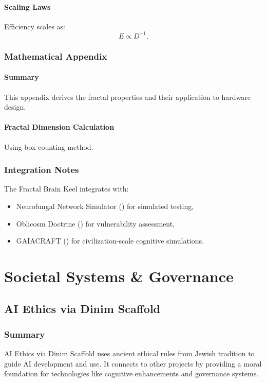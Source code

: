 \documentclass[11pt,oneside]{memoir}
\theoremstyle{plain}
\begin{document}
\subsection{Scaling Laws}
Efficiency scales as:
\begin{equation}
    E \propto D^{-1}.
\end{equation}

\section{Mathematical Appendix}
\subsection{Summary}
This appendix derives the fractal properties and their application to hardware design.

\subsection{Fractal Dimension Calculation}
Using box-counting method.

\section{Integration Notes}
The Fractal Brain Keel integrates with:
\begin{itemize}
    \item Neurofungal Network Simulator () for simulated testing,
    \item Oblicosm Doctrine () for vulnerability assessment,
    \item GAIACRAFT () for civilization-scale cognitive simulations.
\end{itemize}

\part{Societal Systems \& Governance}

\chapter{AI Ethics via Dinim Scaffold}
\label{sec:dinim_scaffold}

\section{Summary}
AI Ethics via Dinim Scaffold uses ancient ethical rules from Jewish tradition to guide AI development and use. It connects to other projects by providing a moral foundation for technologies like cognitive enhancements and governance systems.
\end{document}
